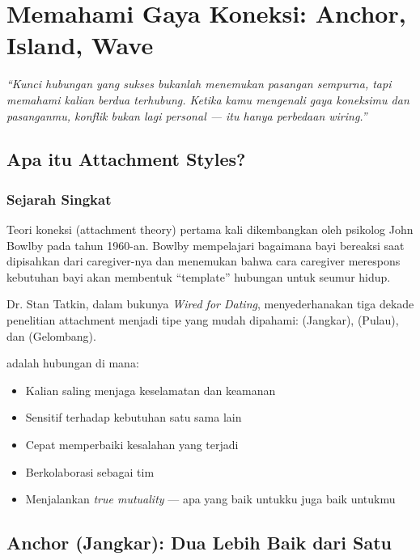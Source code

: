 \chapter{Memahami Gaya Koneksi: Anchor, Island, Wave}

\begin{insightbox}
\textit{``Kunci hubungan yang sukses bukanlah menemukan pasangan sempurna, tapi memahami  kalian berdua terhubung. Ketika kamu mengenali gaya koneksimu dan pasanganmu, konflik bukan lagi personal --- itu hanya perbedaan wiring.''}
\end{insightbox}

\section{Apa itu Attachment Styles?}

\subsection{Sejarah Singkat}

Teori koneksi (attachment theory) pertama kali dikembangkan oleh psikolog John Bowlby pada tahun 1960-an. Bowlby mempelajari bagaimana bayi bereaksi saat dipisahkan dari caregiver-nya dan menemukan bahwa cara caregiver merespons kebutuhan bayi akan membentuk ``template'' hubungan untuk seumur hidup.

Dr. Stan Tatkin, dalam bukunya \textit{Wired for Dating}, menyederhanakan tiga dekade penelitian attachment menjadi tipe yang mudah dipahami:  (Jangkar),  (Pulau), dan  (Gelombang).

\begin{praktikbox}
 adalah hubungan di mana:
\begin{itemize}
    \item Kalian saling menjaga keselamatan dan keamanan
    \item Sensitif terhadap kebutuhan satu sama lain
    \item Cepat memperbaiki kesalahan yang terjadi
    \item Berkolaborasi sebagai tim
    \item Menjalankan \textit{true mutuality} --- apa yang baik untukku juga baik untukmu
\end{itemize}
\end{praktikbox}

\section{Anchor (Jangkar): Dua Lebih Baik dari Satu}

